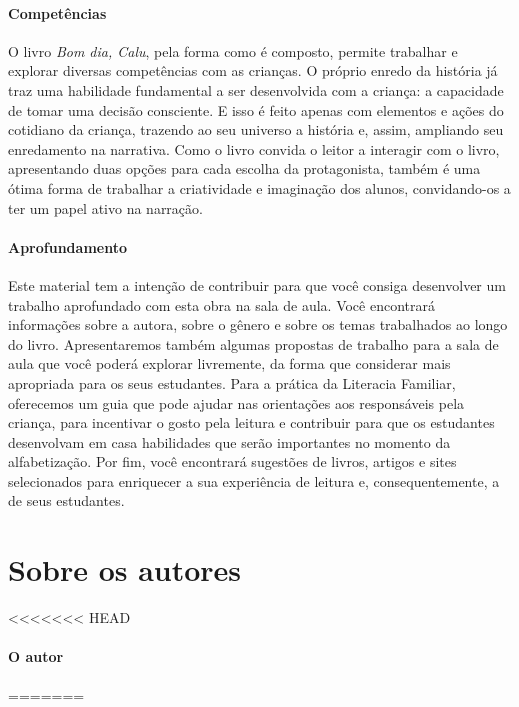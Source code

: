 \documentclass[11pt]{extarticle}
\begin{document}
\paragraph{Competências}
O livro \textit{Bom dia, Calu}, pela forma como é composto, permite trabalhar e explorar diversas competências com as crianças. O próprio enredo da história já traz uma habilidade fundamental a ser desenvolvida com a criança: a capacidade de tomar uma decisão consciente. E isso é feito apenas com elementos e ações do cotidiano da criança, trazendo ao seu universo a história e, assim, ampliando seu enredamento na narrativa. Como o livro convida o leitor a interagir com o livro, apresentando duas opções para cada escolha da protagonista, também é uma ótima forma de trabalhar a criatividade e imaginação dos alunos, convidando-os a ter um papel ativo na narração.


\paragraph{Aprofundamento} Este material tem a 
intenção de contribuir para que você consiga desenvolver um trabalho aprofundado 
com esta obra na sala de aula. Você encontrará informações sobre a autora, sobre 
o gênero e sobre os temas trabalhados ao longo do livro. Apresentaremos também 
algumas propostas de trabalho para a sala de aula que você poderá explorar livremente, 
da forma que considerar mais apropriada para os seus estudantes. Para a prática 
da Literacia Familiar, oferecemos um guia que pode ajudar nas orientações aos 
responsáveis pela criança, para incentivar o gosto pela leitura e contribuir para 
que os estudantes desenvolvam em casa habilidades que serão importantes no momento 
da alfabetização. Por fim, você encontrará sugestões de livros, artigos e sites 
selecionados para enriquecer a sua experiência de leitura e, 
consequentemente, a de seus estudantes.



\section{Sobre os autores}

<<<<<<< HEAD

\paragraph{O autor} 
=======
\end{document}
